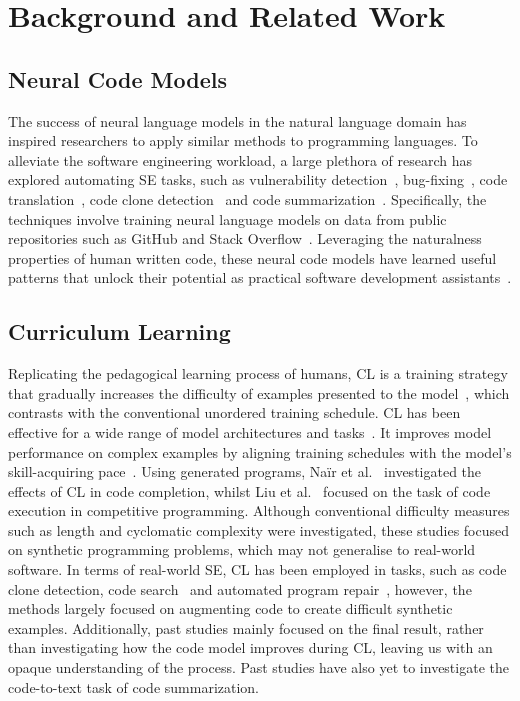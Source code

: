 \section{Background and Related Work}
\subsection{Neural Code Models}
The success of neural language models in the natural language domain has inspired researchers to apply similar methods to programming languages. 
To alleviate the software engineering workload, a large plethora of research has explored automating SE tasks, such as vulnerability detection~\cite{linevul}, bug-fixing~\cite{bugfixwild}, code translation~\cite{codexglue}, code clone detection~\cite{mou2016} and code summarization~\cite{iyer2016summarizing}. 
Specifically, the techniques involve training neural language models on data from public repositories such as GitHub and Stack Overflow~\cite{codet5}.
Leveraging the naturalness properties of human written code, these neural code models have learned useful patterns that unlock their potential as practical software development assistants~\cite{assetorliability}.

\subsection{Curriculum Learning}

Replicating the pedagogical learning process of humans, CL is a training strategy that gradually increases the difficulty of examples presented to the model~\cite{clbengio}, which contrasts with the conventional unordered training schedule.
CL has been effective for a wide range of model architectures and tasks~\cite{curricnn,curricsurvey}. 
It improves model performance on complex examples by aligning training schedules with the model's skill-acquiring pace~\cite{curricnmt}.
Using generated programs, Naïr et al.~\cite{curriccode} investigated the effects of CL in code completion, whilst Liu et al.~\cite{liu-etal-2023-code} focused on the task of code execution in competitive programming.
Although conventional difficulty measures such as length and cyclomatic complexity were investigated, these studies focused on synthetic programming problems, which may not generalise to real-world software.
In terms of real-world SE, CL has been employed in tasks, such as code clone detection, code search~\cite{wangcl} and automated program repair~\cite{apr_cl}, however, the methods largely focused on augmenting code to create difficult synthetic examples.
Additionally, past studies mainly focused on the final result, rather than investigating how the code model improves during CL, leaving us with an opaque understanding of the process.
Past studies have also yet to investigate the code-to-text task of code summarization.